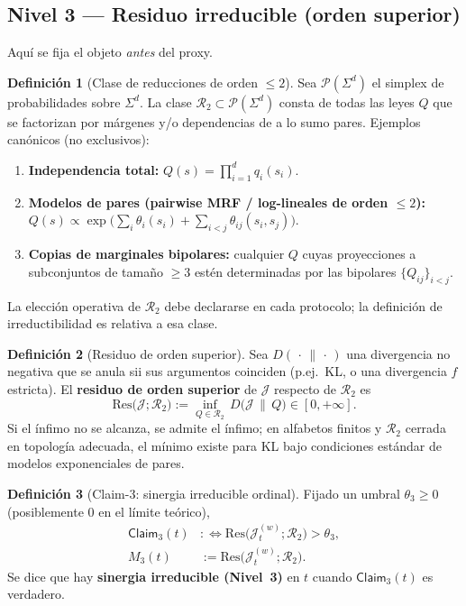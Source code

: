 \documentclass[11pt,a4paper]{article}
\theoremstyle{definition}
\newtheorem{definition}{Definici\'on}[section]
\theoremstyle{plain}
\theoremstyle{remark}
\newcommand{\Res}{\mathrm{Res}}
\newcommand{\Rtwo}{\mathcal{R}_2}
\newcommand{\Jwin}{\mathcal{J}}
\newcommand{\claim}{\mathsf{Claim}}
\begin{document}
\subsection{Nivel 3 --- Residuo irreducible (orden superior)}
\label{sec:L3}

Aqu\'i se fija el objeto \emph{antes} del proxy.

\begin{definition}[Clase de reducciones de orden $\le 2$]
\label{def:R2}
Sea $\mathcal{P}(\Sigma^d)$ el simplex de probabilidades sobre
$\Sigma^d$. La clase $\Rtwo\subset\mathcal{P}(\Sigma^d)$ consta de todas
las leyes $Q$ que se factorizan por m\'argenes y/o dependencias de a lo
sumo pares. Ejemplos can\'onicos (no exclusivos):
\begin{enumerate}[label=(\alph*)]
  \item \textbf{Independencia total:}
  $Q(s)=\prod_{i=1}^d q_i(s_i)$.
  \item \textbf{Modelos de pares (pairwise MRF / log-lineales de orden
  $\le 2$):}
  $Q(s)\propto\exp\bigl(\sum_i\theta_i(s_i)+\sum_{i<j}\theta_{ij}(s_i,s_j)\bigr)$.
  \item \textbf{Copias de marginales bipolares:}
  cualquier $Q$ cuyas proyecciones a subconjuntos de tama\~no $\ge 3$
  est\'en determinadas por las bipolares $\{Q_{ij}\}_{i<j}$.
\end{enumerate}
La elecci\'on operativa de $\Rtwo$ debe declararse en cada protocolo;
la definici\'on de irreductibilidad es relativa a esa clase.
\end{definition}

\begin{definition}[Residuo de orden superior]
\label{def:Res}
Sea $D(\,\cdot\,\|\,\cdot\,)$ una divergencia no negativa que se anula
sii sus argumentos coinciden (p.ej.\ KL, o una divergencia $f$
estricta). El \textbf{residuo de orden superior} de $\Jwin$ respecto de
$\Rtwo$ es
\begin{equation}
\label{eq:Res}
\Res\bigl(\Jwin;\Rtwo\bigr)
:=\inf_{Q\in\Rtwo}\, D\bigl(\Jwin\,\|\,Q\bigr)\in[0,+\infty].
\end{equation}
Si el \'infimo no se alcanza, se admite el \'infimo; en alfabetos finitos
y $\Rtwo$ cerrada en topolog\'ia adecuada, el m\'inimo existe para KL bajo
condiciones est\'andar de modelos exponenciales de pares.
\end{definition}

\begin{definition}[Claim-3: sinergia irreducible ordinal]
\label{def:L3}
Fijado un umbral $\theta_3\ge 0$ (posiblemente $0$ en el l\'imite
te\'orico),
\begin{align}
\label{eq:C3}
\claim_3(t)
&:\iff \Res\bigl(\Jwin_t^{(w)};\Rtwo\bigr)>\theta_3,\\
\label{eq:M3}
M_3(t)
&:=\Res\bigl(\Jwin_t^{(w)};\Rtwo\bigr).
\end{align}
Se dice que hay \textbf{sinergia irreducible (Nivel~3)} en $t$ cuando
$\claim_3(t)$ es verdadero.
\end{definition}
\end{document}
